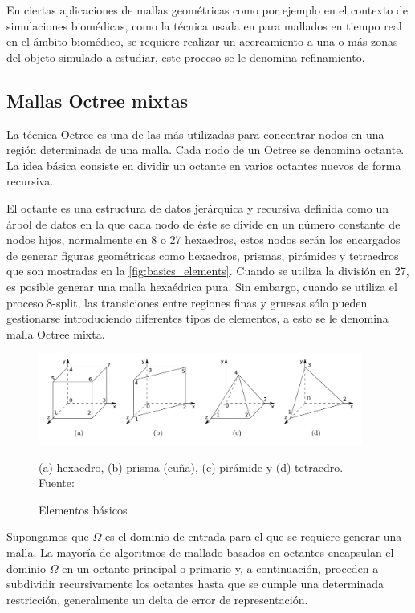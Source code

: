 En ciertas aplicaciones de mallas geométricas como por ejemplo en el contexto de simulaciones biomédicas, como la técnica usada en \cite{lobos2015mixed} para mallados en tiempo real en el ámbito biomédico, se requiere realizar un acercamiento a una o más zonas del objeto simulado a estudiar, este proceso se le denomina refinamiento.

\subsection{Mallas Octree mixtas}

La técnica Octree es una de las más utilizadas para concentrar nodos en una región determinada de una malla. 
Cada nodo de un Octree se denomina octante. La idea básica consiste en dividir un octante en varios octantes nuevos de forma recursiva.

El octante es una estructura de datos jerárquica y recursiva definida como un árbol de datos en la que cada nodo de éste se divide en un número constante de nodos hijos, normalmente en 8 o 27 hexaedros, estos nodos serán los encargados de generar figuras geométricas como hexaedros, prismas, pirámides y tetraedros que son mostradas en la \autoref{fig:basics_elements}.
Cuando se utiliza la división en 27, es posible generar una malla hexaédrica pura. Sin embargo, cuando se utiliza el proceso 8-split, las transiciones entre regiones finas y gruesas sólo pueden gestionarse introduciendo diferentes tipos de elementos, a esto se le denomina malla Octree mixta.

\begin{figure}[h]
    \centering
    \includegraphics[width=0.95\textwidth]{figures/basic-elements.png}
    \caption{\label{fig:basics_elements} Elementos básicos}
     \small{(a) hexaedro, (b) prisma (cuña), (c) pirámide y (d) tetraedro.} \\
    Fuente: \cite{Gonzalez2014}
\end{figure}

Supongamos que $\Omega$ es el dominio de entrada para el que se requiere generar una malla. La mayoría de algoritmos de mallado basados en octantes encapsulan el dominio $\Omega$ en un octante principal o primario y, a continuación, proceden a subdividir recursivamente los octantes hasta que se cumple una determinada restricción, generalmente un delta de error de representación.

